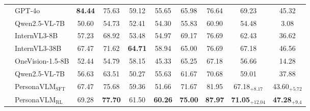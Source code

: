 \begin{table}[!htbp]
{\begin{tabular}{c|l|cccccc|c|c}
\midrule
\midrule
   & GPT-4o                  &   \textbf{84.44} & 75.63 & 59.12 & 55.65 & 65.98 & 76.64 & 69.23    &    45.32        \\
\cmidrule(l){2-10}
\cmidrule(l){2-10}
\rowcolor{gray!15}
 \cellcolor[HTML]{FFFFFF}\multirow{2}{*}{128$k$-Full}    & Qwen2.5-VL-7B     &    50.60 & 54.73 & 52.41 & 54.30 & 55.83 & 60.90 & 54.48    &    3.08       \\
  & InternVL3-8B      &   57.23 & 68.92 & 53.48 & 54.97 & 69.17 & 76.69 & 62.43    &      36.62      \\
& InternVL3-38B    &    67.47 & 71.62 & \textbf{64.71} & 58.94 & 65.00 & 76.69 & 67.18    &         46.56   \\
  & OneVision-1.5-8B    &    52.44 & 54.79 & 58.15 & 45.33 & 65.25 & 67.18 & 56.66    &     14.28       \\
\cmidrule(l){1-10}
\cmidrule(l){2-10}
 & Qwen2.5-VL-7B &  56.63 & 63.51 & 50.27 & 55.63 & 61.67 & 70.68 & 59.01     &    37.88     \\
\rowcolor{blue!10}
\cellcolor[HTML]{FFFFFF}\multirow{1}{*}{128$k$-RAG} & PersonaVLM$_{\text{SFT}}$      &     67.47 & 75.68 & 59.36 & 51.66 & 71.67 & 81.95 & 67.18{\color{gray}$_{+8.17}$}     &      43.60{\color{gray}$_{+5.72}$}       \\
\rowcolor{blue!15}
 \cellcolor[HTML]{FFFFFF}  & PersonaVLM$_{\text{RL}}$   &  69.28 & \textbf{77.70} & 61.50 & \textbf{60.26} & \textbf{75.00} & \textbf{87.97} & \textbf{71.05}{\color{gray}$_{+12.04}$}  &    \textbf{ 47.28}{\color{gray}$_{+9.4}$}       \\
\bottomrule
\end{tabular}}
\vspace{-2mm}
\end{table}
